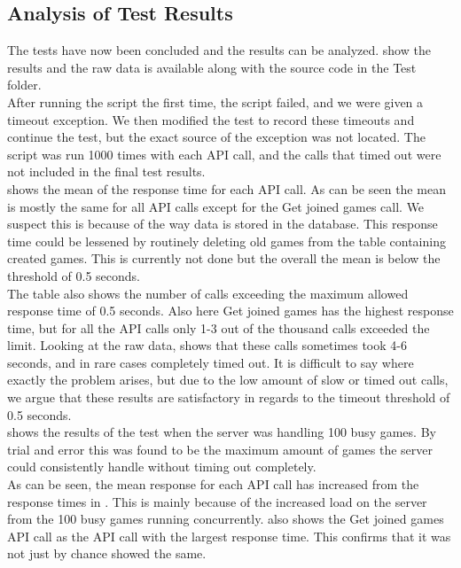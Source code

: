 \subsection{Analysis of Test Results}
The tests have now been concluded and the results can be analyzed. show the results and the raw data is available along with the source code in the Test folder.\\

After running the script the first time, the script failed, and we were given a timeout exception. We then modified the test to record these timeouts and continue the test, but the exact source of the exception was not located. The script was run 1000 times with each API call, and the calls that timed out were not included in the final test results.\\

 shows the mean of the response time for each API call. As can be seen the mean is mostly the same for all API calls except for the Get joined games call. We suspect this is because of the way data is stored in the database. This response time could be lessened by routinely deleting old games from the table containing created games. This is currently not done but the overall the mean is below the threshold of 0.5 seconds.\\

The table also shows the number of calls exceeding the maximum allowed response time of 0.5 seconds. Also here Get joined games has the highest response time, but for all the API calls only 1-3 out of the thousand calls exceeded the limit. Looking at the raw data, shows that these calls sometimes took 4-6 seconds, and in rare cases completely timed out. It is difficult to say where exactly the problem arises, but due to the low amount of slow or timed out calls, we argue that these results are satisfactory in regards to the timeout threshold of 0.5 seconds.\\

 shows the results of the test when the server was handling 100 busy games. By trial and error this was found to be the maximum amount of games the server could consistently handle without timing out completely.\\

As can be seen, the mean response for each API call has increased from the response times in . This is mainly because of the increased load on the server from the 100 busy games running concurrently.  also shows the Get joined games API call as the API call with the largest response time. This confirms that it was not just by chance  showed the same.\\

